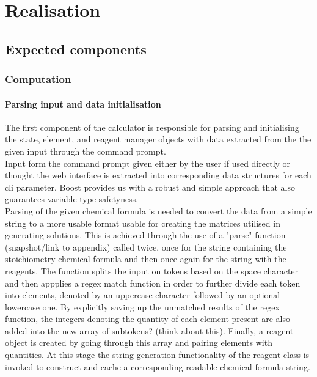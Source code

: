 \chapter{Realisation}
\label{ch:realisation}
\section{Expected components}
\subsection{Computation}
\subsubsection{Parsing input and data initialisation}
The first component of the calculator is responsible for parsing and initialising the state, element, and reagent manager objects with data extracted from the the given input through the command prompt. \\

Input form the command prompt given either by the user if used directly or thought the web interface is extracted into corresponding data structures for each cli parameter. Boost provides us with a robust and simple approach that also guarantees variable type safetyness. \\

Parsing of the given chemical formula is needed to convert the data from a simple string to a more usable format usable for creating the matrices utilised in generating solutions. This is achieved through the use of a "parse" function (snapshot/link to appendix) called twice, once for the string containing the stoichiometry chemical formula and then once again for the string with the reagents. The function splits the input on tokens based on the space character and then appplies a regex match function in order to further divide each token into elements, denoted by an uppercase character followed by an optional lowercase one. By explicitly saving up the unmatched results of the regex function, the integers denoting the quantity of each element present are also added into the new array of subtokens? (think about this). Finally, a reagent object is created by going through this array and pairing elements with quantities. At this stage the string generation functionality of the reagent class is invoked to construct and cache a corresponding readable chemical formula string.\\

